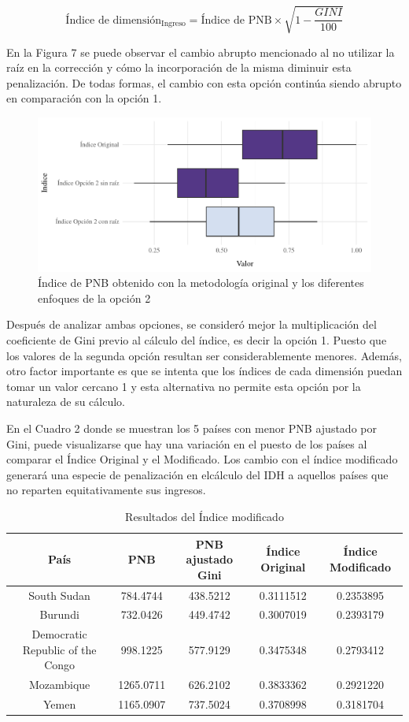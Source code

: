 \documentclass[
  10pt,
]{article}
\begin{document}
\[\text{Índice de dimensión}_\text{Ingreso} = \text{Índice de PNB} \times \sqrt{1-\frac{GINI}{100}}\]

En la Figura 7 se puede observar el cambio abrupto mencionado al no
utilizar la raíz en la corrección y cómo la incorporación de la misma
diminuir esta penalización. De todas formas, el cambio con esta opción
continúa siendo abrupto en comparación con la opción 1.

\begin{figure}
\centering
\includegraphics{Informe_files/figure-latex/Figura7-1.pdf}
\caption{Índice de PNB obtenido con la metodología original y los
diferentes enfoques de la opción 2}
\end{figure}

Después de analizar ambas opciones, se consideró mejor la multiplicación
del coeficiente de Gini previo al cálculo del índice, es decir la opción
1. Puesto que los valores de la segunda opción resultan ser
considerablemente menores. Además, otro factor importante es que se
intenta que los índices de cada dimensión puedan tomar un valor cercano
1 y esta alternativa no permite esta opción por la naturaleza de su
cálculo.

En el Cuadro 2 donde se muestran los 5 países con menor PNB ajustado por
Gini, puede visualizarse que hay una variación en el puesto de los
países al comparar el Índice Original y el Modificado. Los cambio con el
índice modificado generará una especie de penalización en elcálculo del
IDH a aquellos países que no reparten equitativamente sus ingresos.

\begin{table}[H]

\caption{\label{tab:unnamed-chunk-2}Resultados del Índice modificado}
\centering
\begin{tabular}[t]{c|c|c|c|c}
\hline
País & PNB & PNB ajustado Gini & Índice Original & Índice Modificado\\
\hline
South Sudan & 784.4744 & 438.5212 & 0.3111512 & 0.2353895\\
\hline
Burundi & 732.0426 & 449.4742 & 0.3007019 & 0.2393179\\
\hline
Democratic Republic of the Congo & 998.1225 & 577.9129 & 0.3475348 & 0.2793412\\
\hline
Mozambique & 1265.0711 & 626.2102 & 0.3833362 & 0.2921220\\
\hline
Yemen & 1165.0907 & 737.5024 & 0.3708998 & 0.3181704\\
\hline
\end{tabular}
\end{table}
\end{document}
